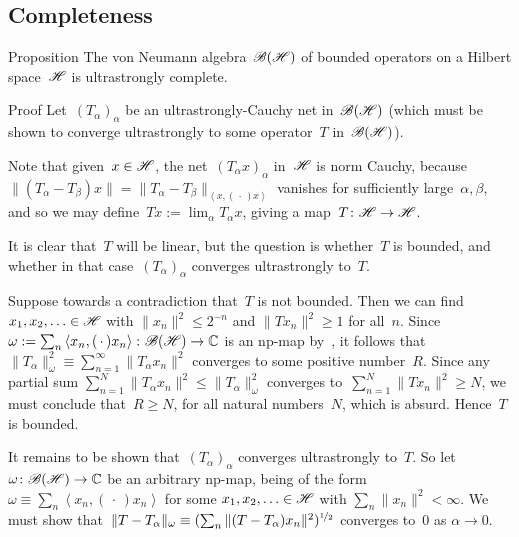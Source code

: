 \documentclass[a]{subfiles}
\begin{document}
\subsection{Completeness}
\begin{parsec}%
\begin{point}[bh-us-complete]{Proposition}%
The von Neumann algebra~$\mathscr{B}(\mathscr{H})$
of bounded operators on a Hilbert space~$\mathscr{H}$
is ultrastrongly complete.
\begin{point}{Proof}
Let~$(T_\alpha)_\alpha$ be an ultrastrongly-Cauchy net
in~$\mathscr{B}(\mathscr{H})$
(which must be shown to converge ultrastrongly to
some operator~$T$ in~$\mathscr{B}(\mathscr{H})$).

Note that given~$x\in \mathscr{H}$,
the net~$(T_\alpha x)_\alpha$ in~$\mathscr{H}$
is norm Cauchy,
because $\|(T_\alpha-T_\beta) x\|
= \| T_\alpha-T_\beta \|_{\left<x,(\,\cdot\,)x\right>}$
vanishes for sufficiently large~$\alpha,\beta$,
and so we may define~$Tx :=\lim_\alpha T_\alpha x$,
giving a map~$T\colon \mathscr{H}\to\mathscr{H}$.

It is clear that~$T$ will be linear,
but the question is whether~$T$ is bounded,
and whether in that 
case~$(T_\alpha)_\alpha$ converges ultrastrongly to~$T$.

Suppose towards a contradiction that~$T$ is not bounded.
Then we can find~$x_1,x_2,\dotsc\in\mathscr{H}$
with $\|x_n\|^2\leq 2^{-n}$
and $\|Tx_n\|^2\geq 1$ for all~$n$.
Since~$\omega:=\sum_n \left<x_n,(\,\cdot\,)x_n\right>\colon 
\mathscr{B}(\mathscr{H})\to\mathbb{C}$
is an np-map by~, 
it follows that~$\|T_\alpha\|_\omega^2\equiv \sum_{n=1}^\infty 
\|T_\alpha x_n\|^2$
converges to some positive number~$R$.
Since any partial sum $\sum_{n=1}^N \|T_\alpha x_n\|^2
\leq \|T_\alpha\|_\omega^2$
converges to~$\sum_{n=1}^N \|T x_n\|^2\geq N$,
we must conclude that~$R\geq N$,
for all natural numbers~$N$,
which is absurd.
Hence~$T$ is bounded.

It remains to be shown that~$(T_\alpha)_\alpha$
converges ultrastrongly to~$T$.
So let $\omega\colon \mathscr{B}(\mathscr{H})\to\mathbb{C}$ be an arbitrary
np-map,
being of the form~$\omega\equiv \sum_n\left<x_n,(\,\cdot\,)x_n\right>$
for some $x_1,x_2,\dotsc\in\mathscr{H}$ with $\sum_n \|x_n\|^2 <\infty$.
We must show that~$\|T-T_\alpha\|_\omega
\equiv (\sum_n \|(T-T_\alpha)x_n\|^2)^{\nicefrac{1}{2}}$ 
converges to~$0$ as $\alpha\to 0$.


\end{point}
\end{point}
\end{parsec}
\end{document}
